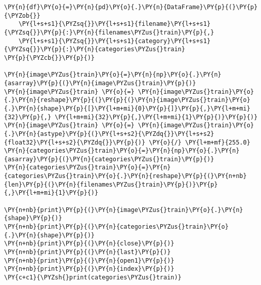 \begin{tcolorbox}[breakable, size=fbox, boxrule=1pt, pad at break*=1mm,colback=cellbackground, colframe=cellborder]
\begin{Verbatim}[commandchars=\\\{\}]
\PY{n}{df}\PY{o}{=}\PY{n}{pd}\PY{o}{.}\PY{n}{DataFrame}\PY{p}{(}\PY{p}{\PYZob{}}
    \PY{l+s+s1}{\PYZsq{}}\PY{l+s+s1}{filename}\PY{l+s+s1}{\PYZsq{}}\PY{p}{:}\PY{n}{filenames\PYZus{}train}\PY{p}{,}
    \PY{l+s+s1}{\PYZsq{}}\PY{l+s+s1}{category}\PY{l+s+s1}{\PYZsq{}}\PY{p}{:}\PY{n}{categories\PYZus{}train}
\PY{p}{\PYZcb{}}\PY{p}{)}

\PY{n}{image\PYZus{}train}\PY{o}{=}\PY{n}{np}\PY{o}{.}\PY{n}{asarray}\PY{p}{(}\PY{n}{image\PYZus{}train}\PY{p}{)}
\PY{n}{image\PYZus{}train} \PY{o}{=} \PY{n}{image\PYZus{}train}\PY{o}{.}\PY{n}{reshape}\PY{p}{(}\PY{p}{(}\PY{n}{image\PYZus{}train}\PY{o}{.}\PY{n}{shape}\PY{p}{[}\PY{l+m+mi}{0}\PY{p}{]}\PY{p}{,}\PY{l+m+mi}{32}\PY{p}{,} \PY{l+m+mi}{32}\PY{p}{,}\PY{l+m+mi}{1}\PY{p}{)}\PY{p}{)}
\PY{n}{image\PYZus{}train} \PY{o}{=} \PY{n}{image\PYZus{}train}\PY{o}{.}\PY{n}{astype}\PY{p}{(}\PY{l+s+s2}{\PYZdq{}}\PY{l+s+s2}{float32}\PY{l+s+s2}{\PYZdq{}}\PY{p}{)} \PY{o}{/} \PY{l+m+mf}{255.0}
\PY{n}{categories\PYZus{}train}\PY{o}{=}\PY{n}{np}\PY{o}{.}\PY{n}{asarray}\PY{p}{(}\PY{n}{categories\PYZus{}train}\PY{p}{)}
\PY{n}{categories\PYZus{}train}\PY{o}{=}\PY{n}{categories\PYZus{}train}\PY{o}{.}\PY{n}{reshape}\PY{p}{(}\PY{n+nb}{len}\PY{p}{(}\PY{n}{filenames\PYZus{}train}\PY{p}{)}\PY{p}{,}\PY{l+m+mi}{1}\PY{p}{)}

\PY{n+nb}{print}\PY{p}{(}\PY{n}{image\PYZus{}train}\PY{o}{.}\PY{n}{shape}\PY{p}{)}
\PY{n+nb}{print}\PY{p}{(}\PY{n}{categories\PYZus{}train}\PY{o}{.}\PY{n}{shape}\PY{p}{)}
\PY{n+nb}{print}\PY{p}{(}\PY{n}{close}\PY{p}{)}
\PY{n+nb}{print}\PY{p}{(}\PY{n}{last}\PY{p}{)}
\PY{n+nb}{print}\PY{p}{(}\PY{n}{open1}\PY{p}{)}
\PY{n+nb}{print}\PY{p}{(}\PY{n}{index}\PY{p}{)}
\PY{c+c1}{\PYZsh{}print(categories\PYZus{}train)}
\end{Verbatim}
\end{tcolorbox}

